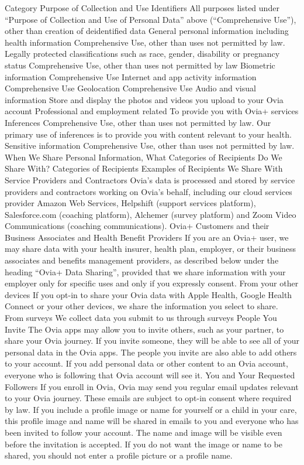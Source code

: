 Category	Purpose of Collection and Use
Identifiers	All purposes listed under “Purpose of Collection and Use of Personal Data” above (“Comprehensive Use”), other than creation of deidentified data
General personal information including health information	Comprehensive Use, other than uses not permitted by law.
Legally protected classifications such as race, gender, disability or pregnancy status	Comprehensive Use, other than uses not permitted by law
Biometric information	Comprehensive Use
Internet and app activity information	Comprehensive Use
Geolocation	Comprehensive Use
Audio and visual information	Store and display the photos and videos you upload to your Ovia account
Professional and employment related	To provide you with Ovia+ services
Inferences	Comprehensive Use, other than uses not permitted by law. Our primary use of inferences is to provide you with content relevant to your health.
Sensitive information	Comprehensive Use, other than uses not permitted by law.
When We Share Personal Information, What Categories of Recipients Do We Share With?
Categories of Recipients	Examples of Recipients We Share With
Service Providers and Contractors	Ovia’s data is processed and stored by service providers and contractors working on Ovia’s behalf, including our cloud services provider Amazon Web Services, Helpshift (support services platform), Salesforce.com (coaching platform), Alchemer (survey platform) and Zoom Video Communications (coaching communications).
Ovia+ Customers and their Business Associates and Health Benefit Providers	If you are an Ovia+ user, we may share data with your health insurer, health plan, employer, or their business associates and benefits management providers, as described below under the heading “Ovia+ Data Sharing”, provided that we share information with your employer only for specific uses and only if you expressly consent.
From your other devices	If you opt-in to share your Ovia data with Apple Health, Google Health Connect or your other devices, we share the information you select to share.
From surveys	We collect data you submit to us through surveys
People You Invite	The Ovia apps may allow you to invite others, such as your partner, to share your Ovia journey. If you invite someone, they will be able to see all of your personal data in the Ovia apps. The people you invite are also able to add others to your account. If you add personal data or other content to an Ovia account, everyone who is following that Ovia account will see it.
You and Your Requested Followers	If you enroll in Ovia, Ovia may send you regular email updates relevant to your Ovia journey. These emails are subject to opt-in consent where required by law. If you include a profile image or name for yourself or a child in your care, this profile image and name will be shared in emails to you and everyone who has been invited to follow your account. The name and image will be visible even before the invitation is accepted. If you do not want the image or name to be shared, you should not enter a profile picture or a profile name.
